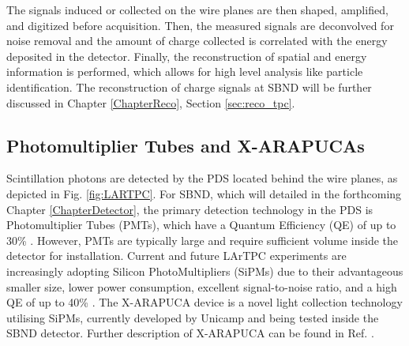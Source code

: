 The signals induced or collected on the wire planes are then shaped, amplified, and digitized before acquisition.
Then, the measured signals are deconvolved for noise removal and the amount of charge collected is correlated with the energy deposited in the detector.
Finally, the reconstruction of spatial and energy information is performed, which allows for high level analysis like particle identification.
The reconstruction of charge signals at SBND will be further discussed in Chapter \ref{ChapterReco}, Section \ref{sec:reco_tpc}.

\subsection{Photomultiplier Tubes and X-ARAPUCAs}
\label{sec:pmtarapuca}

Scintillation photons are detected by the PDS located behind the wire planes, as depicted in Fig. \ref{fig:LARTPC}. 
For SBND, which will detailed in the forthcoming Chapter \ref{ChapterDetector}, the primary detection technology in the PDS is Photomultiplier Tubes (PMTs), which have a Quantum Efficiency (QE) of up to 30\% \cite{pmt_qe}.
However, PMTs are typically large and require sufficient volume inside the detector for installation. 
Current and future LArTPC experiments are increasingly adopting Silicon PhotoMultipliers (SiPMs) due to their advantageous smaller size, lower power consumption, excellent signal-to-noise ratio, and a high QE of up to 40\% \cite{sipm_qe}.
The X-ARAPUCA device is a novel light collection technology utilising SiPMs, currently developed by Unicamp and being tested inside the SBND detector. 
Further description of X-ARAPUCA can be found in Ref. \cite{xarapuca}.

%

